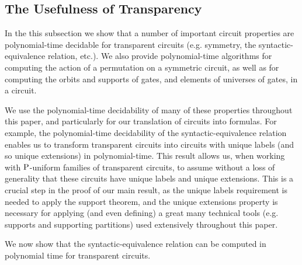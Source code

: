 \documentclass[../paper.tex]{subfiles}
\begin{document}


\subsection{The Usefulness of Transparency}
In the this subsection we show that a number of important circuit properties are
polynomial-time decidable for transparent circuits (e.g. symmetry, the
syntactic-equivalence relation, etc.). We also provide polynomial-time
algorithms for computing the action of a permutation on a symmetric circuit, as
well as for computing the orbits and supports of gates, and elements of
universes of gates, in a circuit.

We use the polynomial-time decidability of many of these properties throughout
this paper, and particularly for our translation of circuits into formulas. For
example, the polynomial-time decidability of the syntactic-equivalence relation
enables us to transform transparent circuits into circuits with unique labels
(and so unique extensions) in polynomial-time. This result allows us, when
working with $\mathrm{P}$-uniform families of transparent circuits, to assume without a
loss of generality that these circuits have unique labels and unique extensions.
This is a crucial step in the proof of our main result, as the unique labels
requirement is needed to apply the support theorem, and the unique extensions
property is necessary for applying (and even defining) a great many technical tools (e.g. supports
and supporting partitions) used extensively throughout this paper.

We now show that the syntactic-equivalence relation can be computed in
polynomial time for transparent circuits.

\end{document}
